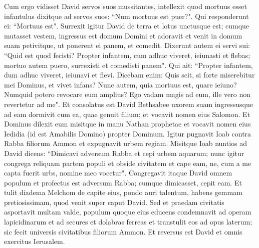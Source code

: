 \begin{biblechapter}
\verse Cum ergo vidisset David servos suos mussitantes, intellexit quod mortuus esset infantulus dixitque ad servos suos: “Num mortuus est puer?". Qui responderunt ei: “Mortuus est". 
\verse Surrexit igitur David de terra et lotus unctusque est; cumque mutasset vestem, ingressus est domum Domini et adoravit et venit in domum suam petivitque, ut ponerent ei panem, et comedit. 
\verse Dixerunt autem ei servi sui: “Quid est quod fecisti? Propter infantem, cum adhuc viveret, ieiunasti et flebas; mortuo autem puero, surrexisti et comedisti panem". 
\verse Qui ait: “Propter infantem, dum adhuc viveret, ieiunavi et flevi. Dicebam enim: Quis scit, si forte miserebitur mei Dominus, et vivet infans? 
\verse Nunc autem, quia mortuus est, quare ieiuno? Numquid potero revocare eum amplius? Ego vadam magis ad eum, ille vero non revertetur ad me". 
\verse Et consolatus est David Bethsabee uxorem suam ingressusque ad eam dormivit cum ea, quae genuit filium; et vocavit nomen eius Salomon. Et Dominus dilexit eum 
\verse misitque in manu Nathan prophetae et vocavit nomen eius Iedidia (id est Amabilis Domino) propter Dominum. 
\verse Igitur pugnavit Ioab contra Rabba filiorum Ammon et expugnavit urbem regiam. 
\verse Misitque Ioab nuntios ad David dicens: “Dimicavi adversum Rabba et cepi urbem aquarum; 
\verse nunc igitur congrega reliquam partem populi et obside civitatem et cape eam, ne, cum a me capta fuerit urbs, nomine meo vocetur". 
\verse Congregavit itaque David omnem populum et profectus est adversum Rabba; cumque dimicasset, cepit eam. 
\verse Et tulit diadema Melchom de capite eius, pondo auri talentum, habens gemmam pretiosissimam, quod venit super caput David. Sed et praedam civitatis asportavit multam valde, 
\verse populum quoque eius educens condemnavit ad operam lapicidinarum et ad secures et dolabras ferreas et transtulit eos ad opus laterum; sic fecit universis civitatibus filiorum Ammon. Et reversus est David et omnis exercitus Ierusalem. 
\end{biblechapter}

